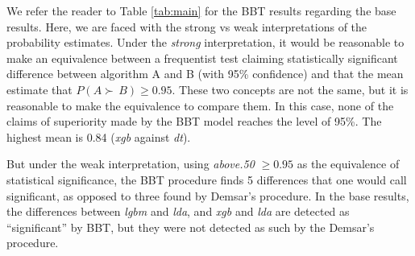 \documentclass[twoside,11pt,preprint]{article}
\begin{document}
\begin{figure}
\begin{floatrow}
\end{floatrow}
\end{figure}

We refer the reader to Table \ref{tab:main} for the BBT results regarding the base results. Here, we are faced with the strong vs weak interpretations of the probability estimates. Under the \emph{strong} interpretation, it would be reasonable to make an equivalence between a frequentist test claiming statistically significant difference between algorithm A and B (with 95\% confidence) and that the mean estimate that \(P(A \succ\,B) \ge 0.95\). These two concepts are not the same, but it is reasonable to make the equivalence to compare them. In this case, none of the claims of superiority made by the BBT model reaches the level of 95\%. The highest mean is 0.84 (\emph{xgb} against \emph{dt}).

But under the weak interpretation, using {\em above.50} \(\ge 0.95\) as the equivalence of statistical significance, the BBT procedure finds 5 differences that one would call significant, as opposed to three found by Demsar's procedure. In the base results, the differences between \emph{lgbm} and \emph{lda}, and \emph{xgb} and \emph{lda} are detected as ``significant'' by BBT, but they were not detected as such by the Demsar's procedure.
\end{document}
